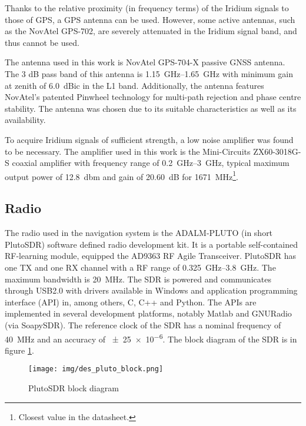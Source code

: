 Thanks to the relative proximity (in frequency terms) of the Iridium signals to those of GPS, a GPS antenna can be used. However, some active antennas, such as the NovAtel GPS-702\cite{des03}, are severely attenuated in the Iridium signal band, and thus cannot be used.

The antenna used in this work is NovAtel GPS-704-X passive GNSS antenna. 
The 3 dB pass band of this antenna is \qtyrange{1.15}{1.65}{GHz} with minimum gain at zenith of \qty{+6.0}{dBic} in the L1 band. Additionally, the antenna features NovAtel’s patented Pinwheel technology for multi-path rejection and phase centre stability\cite{des04}. The antenna was chosen due to its suitable characteristics as well as its availability.

To acquire Iridium signals of sufficient strength, a low noise amplifier was found to be necessary. The amplifier used in this work is the Mini-Circuits ZX60-3018G-S coaxial amplifier with frequency range of \qtyrange{0.2}{3}{GHz}, typical maximum output power of \qty{+12.8}{dbm} and gain of \qty{20.60}{dB} for \qty{1671}{MHz}\footnote{Closest value in the datasheet.}\cite{des06}.

\subsection{Radio}
The radio used in the navigation system is the ADALM-PLUTO (in short PlutoSDR) software defined radio development kit. It is a portable self-contained RF-learning module, equipped the AD9363 RF Agile Transceiver. PlutoSDR has one TX and one RX channel with a RF range of \qtyrange{0.325}{3.8}{GHz}. The maximum bandwidth is \qty{20}{MHz}. The SDR is powered and communicates through USB2.0 with drivers available in Windows and application programming interface (API) in, among others, C, C++ and Python. The APIs are implemented in several development platforms, notably Matlab and GNURadio (via SoapySDR). The reference clock of the SDR has a nominal frequency of \qty{40}{MHz} and an accuracy of \num{\pm25e-6}\cite{des05}. The block diagram of the SDR is in figure \ref{f_des_pluto_block}.

\begin{figure}
    \centering
    \texttt{[image: img/des\_pluto\_block.png]}
    \caption{PlutoSDR block diagram\cite{des05}}
    \label{f_des_pluto_block}
\end{figure}


